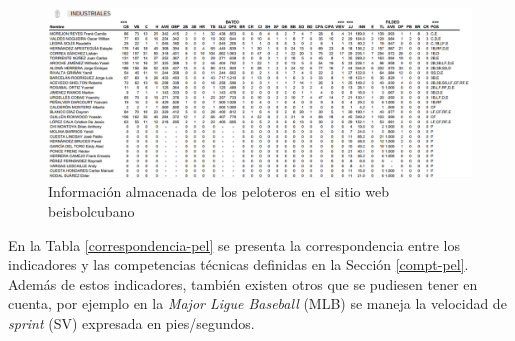 \begin{figure} [H]
	\hspace{-2.6cm}  
	\includegraphics[width=1.25\textwidth]{figuras/informacionPelota.png}
	\caption[Información almacenada de los peloteros en el sitio web beisbolcubano.]{Información almacenada de los peloteros en el sitio web beisbolcubano \cite{INDER2020}}\label{info-pelota}
\end{figure}
\vfill\null
\newpage
{}
\recalctypearea
\pagestyle{fancy} 


En la Tabla \ref{correspondencia-pel} se presenta la correspondencia entre los indicadores y las competencias técnicas definidas en la Sección \ref{compt-pel}. Además de estos indicadores, también existen otros que se pudiesen tener en cuenta, por ejemplo en la \textit{Major Ligue Baseball} (MLB) se maneja la velocidad de \textit{sprint} (SV) expresada en pies/segundos.

